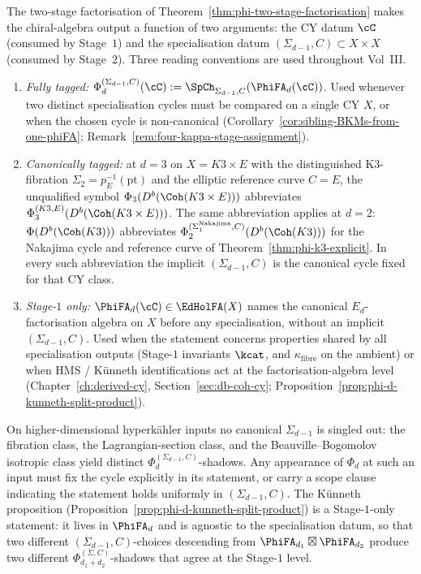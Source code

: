 \begin{remark}
\label{rem:phi-d-parameter-tagging}
The two-stage factorisation of Theorem~\ref{thm:phi-two-stage-factorisation} makes the chiral-algebra output a function of two arguments: the CY datum $\cC$ (consumed by Stage~$1$) and the specialisation datum $(\Sigma_{d-1}, C) \subset X \times X$ (consumed by Stage~$2$). Three reading conventions are used throughout Vol~III.
\begin{enumerate}[label=\textup{(\roman*)}]
 \item \emph{Fully tagged:} $\Phi_d^{(\Sigma_{d-1}, C)}(\cC) := \SpCh_{\Sigma_{d-1}, C}(\PhiFA_d(\cC))$. Used whenever two distinct specialisation cycles must be compared on a single CY $X$, or when the chosen cycle is non-canonical (Corollary~\ref{cor:sibling-BKMs-from-one-phiFA}; Remark~\ref{rem:four-kappa-stage-assignment}).
 \item \emph{Canonically tagged:} at $d = 3$ on $X = K3 \times E$ with the distinguished K3-fibration $\Sigma_2 = p_E^{-1}(\mathrm{pt})$ and the elliptic reference curve $C = E$, the unqualified symbol $\Phi_3(D^b(\Coh(K3 \times E)))$ abbreviates $\Phi_3^{(K3, E)}(D^b(\Coh(K3 \times E)))$. The same abbreviation applies at $d = 2$: $\Phi(D^b(\Coh(K3)))$ abbreviates $\Phi_2^{(\Sigma_1^{\mathrm{Nakajima}}, C)}(D^b(\Coh(K3)))$ for the Nakajima cycle and reference curve of Theorem~\ref{thm:phi-k3-explicit}. In every such abbreviation the implicit $(\Sigma_{d-1}, C)$ is the canonical cycle fixed for that CY class.
 \item \emph{Stage-$1$ only:} $\PhiFA_d(\cC) \in \EdHolFA(X)$ names the canonical $E_d$-factorisation algebra on $X$ before any specialisation, without an implicit $(\Sigma_{d-1}, C)$. Used when the statement concerns properties shared by all specialisation outputs (Stage-$1$ invariants $\kcat$, and $\kappa_{\mathrm{fibre}}$ on the ambient) or when HMS / Künneth identifications act at the factorisation-algebra level (Chapter~\ref{ch:derived-cy}, Section~\ref{sec:db-coh-cy}; Proposition~\ref{prop:phi-d-kunneth-split-product}).
\end{enumerate}
On higher-dimensional hyperkähler inputs no canonical $\Sigma_{d-1}$ is singled out: the fibration class, the Lagrangian-section class, and the Beauville--Bogomolov isotropic class yield distinct $\Phi_d^{(\Sigma_{d-1}, C)}$-shadows. Any appearance of $\Phi_d$ at such an input must fix the cycle explicitly in its statement, or carry a scope clause indicating the statement holds uniformly in $(\Sigma_{d-1}, C)$. The Künneth proposition (Proposition~\ref{prop:phi-d-kunneth-split-product}) is a Stage-$1$-only statement: it lives in $\PhiFA_d$ and is agnostic to the specialisation datum, so that two different $(\Sigma_{d-1}, C)$-choices descending from $\PhiFA_{d_1} \boxtimes \PhiFA_{d_2}$ produce two different $\Phi_{d_1 + d_2}^{(\Sigma, C)}$-shadows that agree at the Stage-$1$ level.
\end{remark}


